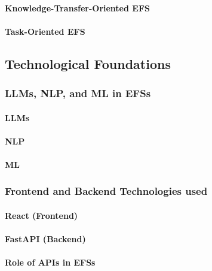 \paragraph{Knowledge-Transfer-Oriented \acl{EFS}} %
\paragraph{Task-Oriented \acl{EFS}}



\subsection{Technological Foundations}


\subsubsection{\aclp{LLM}, \acl{NLP}, and \acl{ML} in \aclp{EFS}}
\paragraph{\aclp{LLM}}
\paragraph{\acl{NLP}}
\paragraph{\acl{ML}}


\subsubsection{Frontend and Backend Technologies used}
\paragraph{React (Frontend)}
\paragraph{FastAPI (Backend)}
\paragraph{Role of \aclp{API} in \aclp{EFS}}


